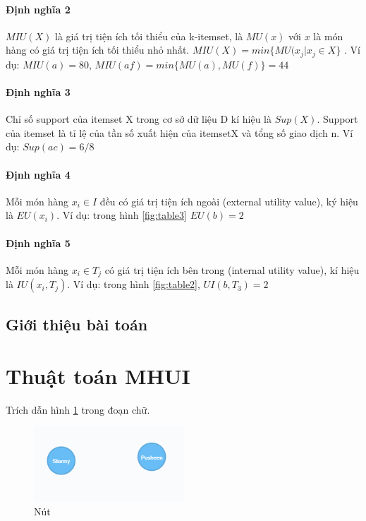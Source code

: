 \paragraph{Định nghĩa 2} $MIU(X)$ là giá trị tiện ích tối thiểu của k-itemset, là $MU(x)$ với $x$ là món hàng có giá trị tiện ích tối thiểu nhỏ nhất. $MIU(X) = min \{MU(x_j|x_j \in X\}$ . Ví dụ: $MIU(a) = 80$, $MIU(af) = min\{MU(a), MU(f)\} = 44$


\paragraph{Định nghĩa 3} Chỉ số support của itemset X trong cơ sở dữ liệu D kí hiệu là $Sup(X)$. Support của itemset là tỉ lệ của tần số xuất hiện của itemsetX và tổng số giao dịch n. Ví dụ: $Sup(ac) = 6/8$

\paragraph{Định nghĩa 4} Mỗi món hàng $x_i \in I$ đều có giá trị tiện ích ngoài (external utility value), ký hiệu là $EU(x_i)$. Ví dụ: trong hình \ref{fig:table3} $EU(b) = 2$

\paragraph{Định nghĩa 5} Mỗi món hàng $x_i \in T_j$ có giá trị tiện ích bên trong (internal utility value), kí hiệu là $IU(x_i, T_j)$. Ví dụ: trong hình \ref{fig:table2}, $UI(b, T_3) = 2$



\subsection{Giới thiệu bài toán}

\section{Thuật toán MHUI}



Trích dẫn hình \ref{fig:node} trong đoạn chữ. 

\begin{figure}[h]
\centering
\includegraphics[width=0.5\textwidth]{image/node.PNG}
\caption{\label{fig:node} Nút}
\end{figure}


